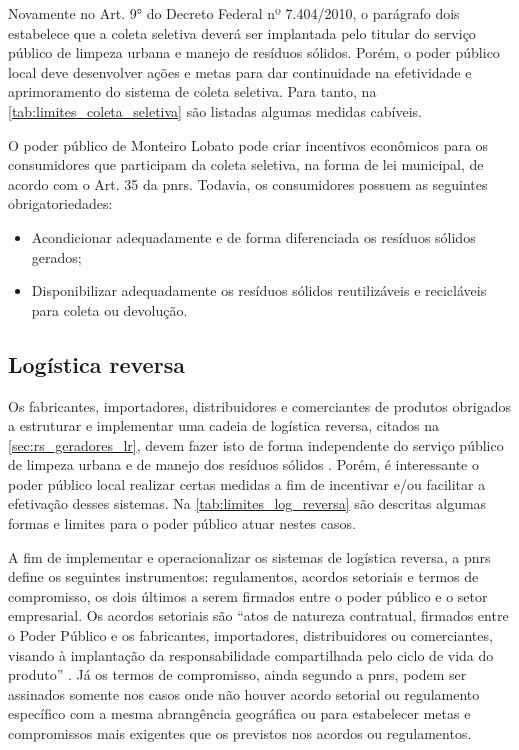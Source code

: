 Novamente no Art. 9° do Decreto Federal nº 7.404/2010, o parágrafo dois estabelece que a coleta seletiva deverá ser implantada pelo titular do serviço público de limpeza urbana e manejo de resíduos sólidos. Porém, o poder público local deve desenvolver ações e metas para dar continuidade na efetividade e aprimoramento do sistema de coleta seletiva. Para tanto, na \autoref{tab:limites_coleta_seletiva} são listadas algumas medidas cabíveis. 



O poder público de Monteiro Lobato pode criar incentivos econômicos para os consumidores que participam da coleta seletiva, na forma de lei municipal, de acordo com o Art. 35 da \gls{pnrs}. Todavia, os consumidores possuem as seguintes obrigatoriedades:

\begin{itemize}
	\item Acondicionar adequadamente e de forma diferenciada os resíduos sólidos gerados; 
	\item Disponibilizar adequadamente os resíduos sólidos reutilizáveis e recicláveis para coleta ou devolução.    
\end{itemize}

\subsection{Logística reversa}
\label{subsec:desc_lr}

Os fabricantes, importadores, distribuidores e comerciantes de produtos obrigados a estruturar e implementar uma cadeia de logística reversa, citados na \autoref{sec:rs_geradores_lr}, devem fazer isto de forma independente do serviço público de limpeza urbana e de manejo dos resíduos sólidos \cite{brasil:12305}. Porém, é interessante o poder público local realizar certas medidas a fim de incentivar e/ou facilitar a efetivação desses sistemas. Na \autoref{tab:limites_log_reversa} são descritas algumas formas e limites para o poder público atuar nestes casos.




\FloatBarrier


A fim de implementar e operacionalizar os sistemas de logística reversa, a \gls{pnrs} define os seguintes instrumentos: regulamentos, acordos setoriais e termos de compromisso, os dois últimos a serem firmados entre o poder público e o setor empresarial. Os acordos setoriais são “atos de natureza contratual, firmados entre o Poder Público e os fabricantes, importadores, distribuidores ou comerciantes, visando à implantação da responsabilidade compartilhada pelo ciclo de vida do produto” \cite{brasil:12305}. Já os termos de compromisso, ainda segundo a  \gls{pnrs}, podem ser assinados somente nos casos onde não houver acordo setorial ou regulamento específico com a mesma abrangência geográfica ou para estabelecer metas e compromissos mais exigentes que os previstos nos acordos ou regulamentos.


